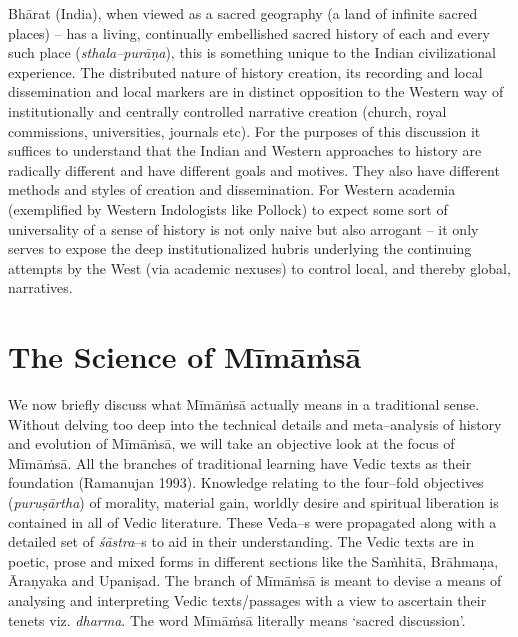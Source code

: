 Bhārat (India), when viewed as a sacred geography (a land of infinite sacred places) – has a living, continually embellished sacred history of each and every such place (\textit{sthala–purāṇa}), this is something unique to the Indian civilizational experience. The distributed nature of history creation, its recording and local dissemination and local markers are in distinct opposition to the Western way of institutionally and centrally controlled narrative creation (church, royal commissions, universities, journals etc). For the purposes of this discussion it suffices to understand that the Indian and Western approaches to history are radically different and have different goals and motives. They also have different methods and styles of creation and dissemination. For Western academia (exemplified by Western Indologists like Pollock) to expect some sort of universality of a sense of history is not only naive but also arrogant – it only serves to expose the deep institutionalized hubris underlying the continuing attempts by the West (via academic nexuses) to control local, and thereby global, narratives.


\section*{The Science of Mīmāṁsā}

We now briefly discuss what Mīmāṁsā actually means in a traditional sense. Without delving too deep into the technical details and meta–analysis of history and evolution of Mīmāṁsā, we will take an objective look at the focus of Mīmāṁsā. All the branches of traditional learning have Vedic texts as their foundation (Ramanujan 1993). Knowledge relating to the four–fold objectives (\textit{puruṣārtha}) of morality, material gain, worldly desire and spiritual liberation is contained in all of Vedic literature. These Veda–s were propagated along with a detailed set of \textit{śāstra}–s to aid in their understanding. The Vedic texts are in poetic, prose and mixed forms in different sections like the Saṁhitā, Brāhmaṇa, Āraṇyaka and Upaniṣad. The branch of Mīmāṁsā is meant to devise a means of analysing and interpreting Vedic texts/passages with a view to ascertain their tenets viz. \textit{dharma}. The word Mīmāṁsā literally means ‘sacred discussion’.

